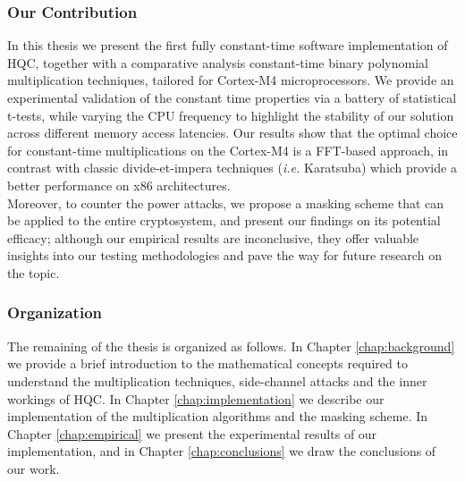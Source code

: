 \subsubsection{Our Contribution}
In this thesis we present the first fully constant-time software implementation of HQC, together with a comparative analysis
constant-time binary polynomial multiplication techniques, tailored for Cortex-M4 microprocessors. We provide an experimental
validation of the constant time properties via a battery of statistical t-tests, while varying the CPU frequency to highlight
the stability of our solution across different memory access latencies. Our results show that the optimal choice for constant-time
multiplications on the Cortex-M4 is a FFT-based approach, in contrast with classic divide-et-impera techniques (\textit{i.e.} Karatsuba)
which provide a better performance on x86 architectures.\\
Moreover, to counter the power attacks, we propose a masking scheme that can be applied to the entire cryptosystem, 
and present our findings on its potential efficacy; although our empirical results are inconclusive, they offer valuable insights
into our testing methodologies and pave the way for future research on the topic.

\subsubsection*{Organization}
The remaining of the thesis is organized as follows. In Chapter \ref{chap:background} we provide a brief introduction to the
mathematical concepts required to understand the multiplication techniques, side-channel attacks and the inner workings of HQC.
In Chapter \ref{chap:implementation} we describe our implementation of the multiplication algorithms and the masking scheme.
In Chapter \ref{chap:empirical} we present the experimental results of our implementation, and in Chapter \ref{chap:conclusions}
we draw the conclusions of our work.



